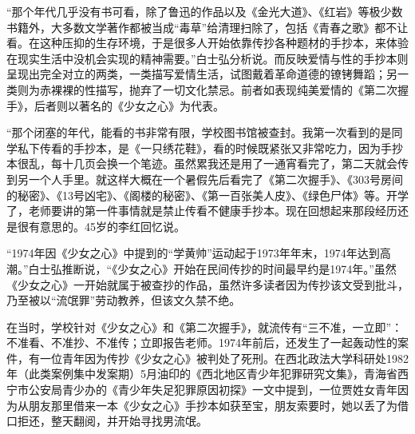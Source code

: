 \documentclass[12pt,UTF8]{ctexbook}
\begin{document}
“那个年代几乎没有书可看，除了鲁迅的作品以及《金光大道》、《红岩》等极少数书籍外，大多数文学著作都被当成“毒草”给清理扫除了，包括《青春之歌》都不让看。在这种压抑的生存环境，于是很多人开始依靠传抄各种题材的手抄本，来体验在现实生活中没机会实现的精神需要。”白士弘分析说。而反映爱情与性的手抄本则呈现出完全对立的两类，一类描写爱情生活，试图戴着革命道德的镣铐舞蹈；另一类则为赤裸裸的性描写，抛弃了一切文化禁忌。前者如表现纯美爱情的《第二次握手》，后者则以著名的《少女之心》为代表。

“那个闭塞的年代，能看的书非常有限，学校图书馆被查封。我第一次看到的是同学私下传看的手抄本，是《一只绣花鞋》，看的时候既紧张又非常吃力，因为手抄本很乱，每十几页会换一个笔迹。虽然累我还是用了一通宵看完了，第二天就会传到另一个人手里。就这样大概在一个暑假先后看完了《第二次握手》、《303号房间的秘密》、《13号凶宅》、《阁楼的秘密》、《第一百张美人皮》、《绿色尸体》等。开学了，老师要讲的第一件事情就是禁止传看不健康手抄本。现在回想起来那段经历还是很有意思的。45岁的李红回忆说。

“1974年因《少女之心》中提到的“学黄帅”运动起于1973年年末，1974年达到高潮。”白士弘推断说，“《少女之心》开始在民间传抄的时间最早约是1974年。”虽然《少女之心》一开始就属于被查抄的作品，虽然许多读者因为传抄该文受到批斗，乃至被以“流氓罪”劳动教养，但该文久禁不绝。

在当时，学校针对《少女之心》和《第二次握手》，就流传有“三不准，一立即”：不准看、不准抄、不准传；立即报告老师。1974年前后，还发生了一起轰动性的案件，有一位青年因为传抄《少女之心》被判处了死刑。在西北政法大学科研处1982年（此类案例集中发案期）5月油印的《西北地区青少年犯罪研究文集》，青海省西宁市公安局青少办的《青少年失足犯罪原因初探》一文中提到，一位贾姓女青年因为从朋友那里借来一本《少女之心》手抄本如获至宝，朋友索要时，她以丢了为借口拒还，整天翻阅，并开始寻找男流氓。



\backmatter
\end{document}
